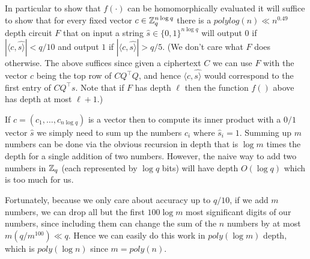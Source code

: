 In particular to show that \(f(\cdot)\) can be homomorphically evaluated
it will suffice to show that for every fixed vector
\(c\in {\mathbb{Z}}_q^{n\log q}\) there is a \(polylog(n) \ll n^{0.49}\) depth
circuit \(F\) that on input a string \(\hat{s}\in\{0,1\}^{n \log q}\)
will output \(0\) if \(|\langle c,\hat{s \rangle}| < q/10\) and output
\(1\) if \(|\langle c,\hat{s \rangle}| > q/5\). (We don't care what
\(F\) does otherwise. The above suffices since given a ciphertext \(C\)
we can use \(F\) with the vector \(c\) being the top row of
\(\ensuremath{\mathit{CQ}}^\top Q\), and hence
\(\langle c,\hat{s \rangle}\) would correspond to the first entry of
\(\ensuremath{\mathit{CQ}}^\top s\). Note that if \(F\) has depth
\(\ell\) then the function \(f()\) above has depth at most \(\ell+1\).)


If \(c=(c_1,\ldots,c_{n\log q})\) is a vector then to compute its inner
product with a \(0/1\) vector \(\hat{s}\) we simply need to sum up the
numbers \(c_i\) where \(\hat{s}_i=1\). Summing up \(m\) numbers can be
done via the obvious recursion in depth that is \(\log m\) times the
depth for a single addition of two numbers. However, the naive way to
add two numbers in \({\mathbb{Z}}_q\) (each represented by \(\log q\) bits) will
have depth \(O(\log q)\) which is too much for us.


Fortunately, because we only care about accuracy up to \(q/10\), if we
add \(m\) numbers, we can drop all but the first \(100\log m\) most
significant digits of our numbers, since including them can change the
sum of the \(n\) numbers by at most \(m(q/m^{100}) \ll q\). Hence we can
easily do this work in \(poly(\log m)\) depth, which is \(poly(\log n)\)
since \(m=poly(n)\).

